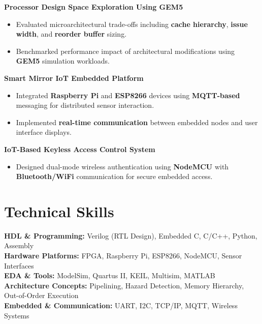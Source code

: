 \documentclass[letterpaper,11pt]{article}
\begin{document}
\textbf{Processor Design Space Exploration Using GEM5}
\begin{itemize}
\item Evaluated microarchitectural trade-offs including \textbf{cache hierarchy}, \textbf{issue width}, and \textbf{reorder buffer} sizing.
\item Benchmarked performance impact of architectural modifications using \textbf{GEM5} simulation workloads.
\end{itemize}

\textbf{Smart Mirror IoT Embedded Platform}
\begin{itemize}
\item Integrated \textbf{Raspberry Pi} and \textbf{ESP8266} devices using \textbf{MQTT-based} messaging for distributed sensor interaction.
\item Implemented \textbf{real-time communication} between embedded nodes and user interface displays.
\end{itemize}

\textbf{IoT-Based Keyless Access Control System}
\begin{itemize}
\item Designed dual-mode wireless authentication using \textbf{NodeMCU} with \textbf{Bluetooth/WiFi} communication for secure embedded access.
\end{itemize}

\section*{Technical Skills}

\textbf{HDL \& Programming:} Verilog (RTL Design), Embedded C, C/C++, Python, Assembly \\
\textbf{Hardware Platforms:} FPGA, Raspberry Pi, ESP8266, NodeMCU, Sensor Interfaces \\
\textbf{EDA \& Tools:} ModelSim, Quartus II, KEIL, Multisim, MATLAB \\
\textbf{Architecture Concepts:} Pipelining, Hazard Detection, Memory Hierarchy, Out-of-Order Execution \\
\textbf{Embedded \& Communication:} UART, I2C, TCP/IP, MQTT, Wireless Systems
\end{document}
